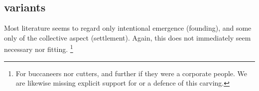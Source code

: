 	\subsection{ variants}
	\label{ss:possyemergences}
		Most literature seems to regard only intentional emergence (founding), and some only of the collective aspect (settlement). Again, this does not immediately seem necessary nor fitting.%
		\footnote{For buccaneers nor cutters, and further if they were a corporate people. We are likewise missing explicit support for or a defence of this carving.} %
